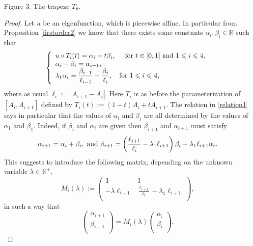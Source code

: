 \documentclass[12pt,english]{smfart} %
\theoremstyle{remark}
\newcommand{\R}{\mathbb{R}}
\begin{document}
\begin{center}
\begin{tikzpicture}[x=0.75pt,y=0.75pt,yscale=-1,xscale=1]
\end{tikzpicture}

 Figure 3. The trapeze $T_\theta$.
 \end{center}
 
 \begin{proof} Let $u$ be an eigenfunction, which is piecewise affine. In particular from Proposition \ref{firstorder2} we know that   there exists some constants $\alpha_i,\beta_i \in \R$ such that 
\begin{eqnarray}\label{relation1}
\left\{
 \begin{array}{ll}
u\circ T_i(t)=\alpha_i +t \beta_i,\quad  \textnormal{ for } t\in[0,1] \text{ and }  1\leqslant i \leqslant 4,\\
\alpha_i+\beta_i=\alpha_{i+1},\\ \displaystyle
\lambda_1\alpha_i=\frac{\beta_{i-1}}{\ell_{i-1}} - \frac{\beta_i}{\ell_i}, \quad \textnormal{for } 1\leqslant i  \leqslant 4,
 \end{array}
  \right. 
 \end{eqnarray}
 where as usual $\ell_i:=|A_{i+1}-A_i|$. Here    $T_i$ is as before the parameterization of $[A_i,A_{i+1}]$ defined by $T_i(t) := (1-t)A_i + tA_{i+1}$.  The relation in \eqref{relation1} says  in particular that the values of $\alpha_i$ and $\beta_i$ are all determined by the values of $\alpha_1$ and $\beta_1$. Indeed, if $\beta_i$ and $\alpha_i$ are given then $\beta_{i+1}$ and $\alpha_{i+1}$  must satisfy
 $$\alpha_{i+1}=\alpha_i+\beta_i,  \textnormal{ and }
 \beta_{i+1}=\left(\frac{\ell_{i+1}}{\ell_i}-\lambda_1 \ell_{i+1}\right)\beta_i -\lambda_1\ell_{i+1} \alpha_i.$$
This suggests to introduce the following matrix, depending on the unknown variable $\lambda \in \R^+$, 
$$
M_i(\lambda):=
\left(
\begin{array}{cc}
1 & 1 \\
-\lambda \ell_{i+1} & \displaystyle \frac{\ell_{i+1}}{\ell_i}-\lambda_1 \ell_{i+1}\\
\end{array}
\right),
$$ 
in such a way  that
 $$
\left(
\begin{array}{c}
\alpha_{i+1} \\
\beta_{i+1}\\
\end{array}
\right)
=M_i(\lambda) \left(
\begin{array}{c}
\alpha_{i} \\
\beta_{i}\\
\end{array}
\right).
$$
\end{proof}
\end{document}
